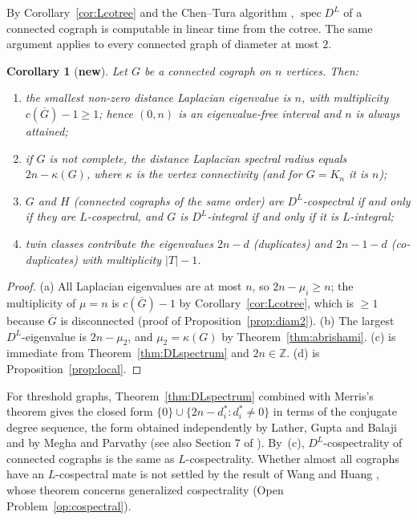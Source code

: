 \documentclass[11pt]{article}
\theoremstyle{plain}
\newtheorem{corollary}[theorem]{Corollary}
\theoremstyle{definition}
\theoremstyle{remark}
\DeclareMathOperator{\spec}{spec}
\begin{document}
	By Corollary~\ref{cor:Lcotree} and the Chen--Tura algorithm \cite{ChenTura2024}, $\spec D^L$ of a connected cograph is computable in linear time from the cotree. The same argument applies to every connected graph of diameter at most $2$.
	
	\begin{corollary}[\textbf{new}]
		\label{cor:DLconsequences}
		Let $G$ be a connected cograph on $n$ vertices. Then:
		\begin{enumerate}[label=(\alph*)]
			\item the smallest non-zero distance Laplacian eigenvalue is $n$, with multiplicity $c(\overline G)-1\ge1$; hence $(0,n)$ is an eigenvalue-free interval and $n$ is always attained;
			\item if $G$ is not complete, the distance Laplacian spectral radius equals $2n-\kappa(G)$, where $\kappa$ is the vertex connectivity (and for $G=K_n$ it is $n$);
			\item $G$ and $H$ (connected cographs of the same order) are $D^L$-cospectral if and only if they are $L$-cospectral, and $G$ is $D^L$-integral if and only if it is $L$-integral;
			\item twin classes contribute the eigenvalues $2n-d$ (duplicates) and $2n-1-d$ (co-duplicates) with multiplicity $|T|-1$.
		\end{enumerate}
	\end{corollary}
	\begin{proof}
		(a) All Laplacian eigenvalues are at most $n$, so $2n-\mu_i\ge n$; the multiplicity of $\mu=n$ is $c(\overline G)-1$ by Corollary~\ref{cor:Lcotree}, which is $\ge1$ because $\overline G$ is disconnected (proof of Proposition~\ref{prop:diam2}). (b) The largest $D^L$-eigenvalue is $2n-\mu_2$, and $\mu_2=\kappa(G)$ by Theorem~\ref{thm:abrishami}. (c) is immediate from Theorem~\ref{thm:DLspectrum} and $2n\in\mathbb Z$. (d) is Proposition~\ref{prop:local}. \qedhere
	\end{proof}
	
	For threshold graphs, Theorem~\ref{thm:DLspectrum} combined with Merris's theorem gives the closed form $\{0\}\cup\{2n-d_i^*:d_i^*\ne0\}$ in terms of the conjugate degree sequence, the form obtained independently by Lather, Gupta and Balaji\cite{LatherGuptaBalaji2025} and by Megha and Parvathy\cite{MeghaParvathy2026} (see also Section 7 of \cite{MannaMandal2026}). By~(c), $D^L$-cospectrality of connected cographs is the same as $L$-cospectrality. Whether almost all cographs have an $L$-cospectral mate is not settled by the result of Wang and Huang \cite{WangHuang2025}, whose theorem concerns generalized cospectrality (Open Problem~\ref{op:cospectral}).
	
\end{document}

